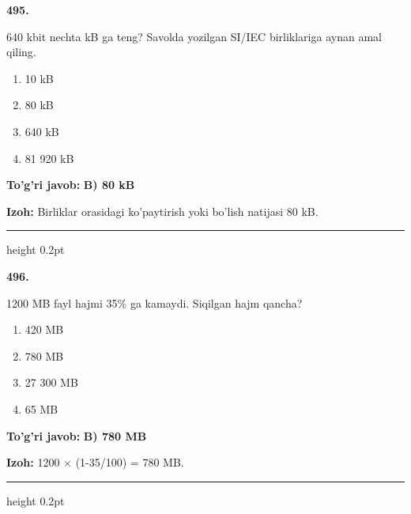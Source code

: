 \documentclass[10pt,a4paper,oneside]{article}
\begin{document}
\noindent\textbf{\color{ink}495.}
\par
640 kbit nechta kB ga teng? Savolda yozilgan SI/IEC birliklariga aynan amal qiling.
\begin{enumerate}[label=\Alph*),leftmargin=9mm]
\item 10 kB
\item 80 kB
\item 640 kB
\item 81 920 kB
\end{enumerate}
\begin{tcolorbox}[enhanced,breakable,colback=teal!4,colframe=teal!50!black,boxrule=0.5pt,arc=1.1mm,left=3mm,right=3mm,top=1.7mm,bottom=1.7mm,before skip=2mm,after skip=2mm]
\textbf{\color{teal}To'g'ri javob:} \textbf{B) 80 kB}
\par\smallskip
\textbf{Izoh:} Birliklar orasidagi ko'paytirish yoki bo'lish natijasi 80 kB.
\end{tcolorbox}
\vspace{2mm}\hrule height 0.2pt \vspace{3mm}

\noindent\textbf{\color{ink}496.}
\par
1200 MB fayl hajmi 35\% ga kamaydi. Siqilgan hajm qancha?
\begin{enumerate}[label=\Alph*),leftmargin=9mm]
\item 420 MB
\item 780 MB
\item 27 300 MB
\item 65 MB
\end{enumerate}
\begin{tcolorbox}[enhanced,breakable,colback=teal!4,colframe=teal!50!black,boxrule=0.5pt,arc=1.1mm,left=3mm,right=3mm,top=1.7mm,bottom=1.7mm,before skip=2mm,after skip=2mm]
\textbf{\color{teal}To'g'ri javob:} \textbf{B) 780 MB}
\par\smallskip
\textbf{Izoh:} 1200 \ensuremath{\times} (1-35/100) = 780 MB.
\end{tcolorbox}
\vspace{2mm}\hrule height 0.2pt \vspace{3mm}
\end{document}
